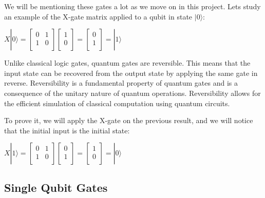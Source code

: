 \documentclass[inscr,ack,preface]{diphdthesis}
\begin{document}
We will be mentioning these gates a lot as we move on in this project.
Lets study an example of the X-gate matrix applied to a \acrshort{qubit} in state $|0\rangle$:
\Large
\begin{center}
$X|0\rangle = \begin{bmatrix}
0 & 1 \\
1 & 0 \\
\end{bmatrix}
\begin{bmatrix}
1 \\
0 \\
\end{bmatrix} = 
\begin{bmatrix}
0 \\
1 \\
\end{bmatrix} = |1\rangle$

\end{center}
\normalsize

Unlike classical logic gates, quantum gates are reversible. This means that the input state can be recovered from the output state by applying the same gate in reverse. Reversibility is a fundamental property of quantum gates and is a consequence of the unitary nature of quantum operations. Reversibility allows for the efficient simulation of classical computation using quantum circuits.

To prove it, we will apply the X-gate on the previous result, and we will notice that the initial input is the initial state:

\Large
\begin{center}
$X|1\rangle = \begin{bmatrix}
0 & 1 \\
1 & 0 \\
\end{bmatrix}
\begin{bmatrix}
0 \\
1 \\
\end{bmatrix} = 
\begin{bmatrix}
1 \\
0 \\
\end{bmatrix} = |0\rangle$

\end{center}
\normalsize

\subsection{Single Qubit Gates}
\end{document}
